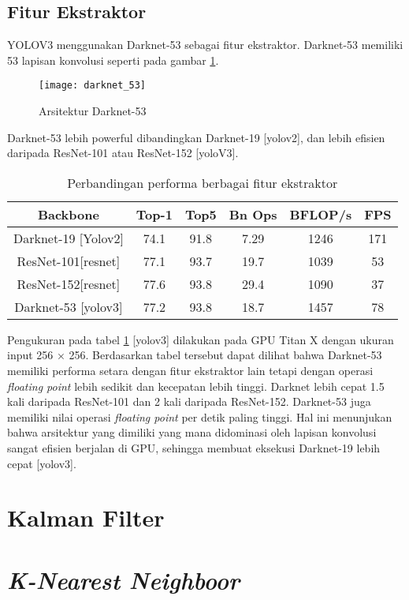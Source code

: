 \documentclass[../thesis.tex]{subfiles}
\begin{document}
\subsection{Fitur Ekstraktor}
YOLOV3 menggunakan Darknet-53 sebagai fitur ekstraktor. Darknet-53 memiliki 53 lapisan konvolusi seperti pada gambar \ref{darknet_53}.
\begin{figure}[htp]
	\centering
	\texttt{[image: darknet\_53]}
	\caption{Arsitektur Darknet-53}
	\label{darknet_53}
\end{figure}
Darknet-53 lebih powerful dibandingkan Darknet-19 [yolov2], dan lebih efisien daripada ResNet-101 atau ResNet-152 [yoloV3].

\begin{table}[htp]
\centering
\begin{tabular}{ cccccc } 
	Backbone & Top-1 & Top5 & Bn Ops & BFLOP/s & FPS\\
	\hline
	Darknet-19 [Yolov2]& 74.1& 91.8& 7.29& 1246 & 171\\
	ResNet-101[resnet] & 77.1& 93.7& 19.7& 1039 & 53 \\
	ResNet-152[resnet] & 77.6& 93.8 &29.4& 1090 & 37 \\
	Darknet-53 [yolov3] &77.2& 93.8&18.7& 1457 & 78 \\
\end{tabular}
\caption{Perbandingan performa berbagai fitur ekstraktor}
\label{tabel_comp_FE}
\end{table}
Pengukuran pada tabel \ref{tabel_comp_FE} [yolov3] dilakukan pada GPU Titan X dengan ukuran input 256 × 256. Berdasarkan tabel tersebut dapat dilihat bahwa Darknet-53 memiliki performa setara dengan fitur ekstraktor lain tetapi dengan operasi \textit{floating point} lebih sedikit dan kecepatan lebih tinggi. Darknet lebih cepat 1.5 kali daripada ResNet-101 dan 2 kali daripada ResNet-152.
Darknet-53 juga memiliki nilai operasi \textit{floating point} per detik paling tinggi. Hal ini menunjukan bahwa arsitektur yang dimiliki yang mana didominasi oleh lapisan konvolusi sangat efisien berjalan di GPU, sehingga membuat eksekusi Darknet-19 lebih cepat [yolov3].



\section{Kalman Filter}



\section{\textit{K-Nearest Neighboor}}
\end{document}
